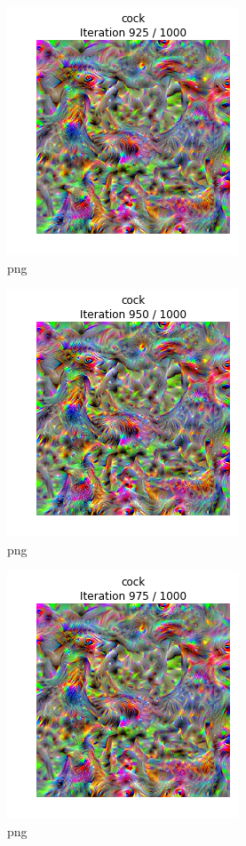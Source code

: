 \documentclass[]{book}
\theoremstyle{definition}
\theoremstyle{definition}
\theoremstyle{definition}
\theoremstyle{remark}
\begin{document}
\begin{figure}
\centering
\includegraphics{Network-Visualization-TensorFlow_files/Network-Visualization-TensorFlow_22_37.png}
\caption{png}
\end{figure}

\begin{figure}
\centering
\includegraphics{Network-Visualization-TensorFlow_files/Network-Visualization-TensorFlow_22_38.png}
\caption{png}
\end{figure}

\begin{figure}
\centering
\includegraphics{Network-Visualization-TensorFlow_files/Network-Visualization-TensorFlow_22_39.png}
\caption{png}
\end{figure}
\end{document}
